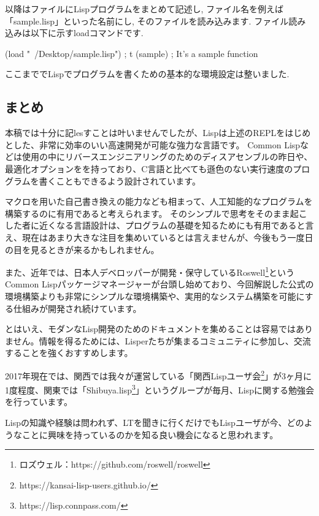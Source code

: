 \documentclass[mingoth,a4paper]{jsarticle}
\begin{document}
以降はファイルにLispプログラムをまとめて記述し, ファイル名を例えば「sample.lisp」といった名前にし, そのファイルを読み込みます. ファイル読み込みは以下に示すloadコマンドです. 

\begin{commandline}
(load "~/Desktop/sample.lisp")
; t
(sample)
; It's a sample function
\end{commandline}

ここまででLispでプログラムを書くための基本的な環境設定は整いました. 


\subsection{まとめ}
本稿では十分に記lesすことは叶いませんでしたが、Lispは上述のREPLをはじめとした、非常に効率のいい高速開発が可能な強力な言語です。
Common Lispなどは使用の中にリバースエンジニアリングのためのディスアセンブルの昨日や、最適化オプションをを持っており、C言語と比べても遜色のない実行速度のプログラムを書くこともできるよう設計されています。

マクロを用いた自己書き換えの能力なども相まって、人工知能的なプログラムを構築するのに有用であると考えられます。
そのシンプルで思考をそのまま起こした者に近くなる言語設計は、プログラムの基礎を知るためにも有用であると言え、現在はあまり大きな注目を集めいているとは言えませんが、今後もう一度日の目を見るときが来るかもしれません。

また、近年では、日本人デベロッパーが開発・保守しているRoswell\footnote{ロズウェル：https://github.com/roswell/roswell}というCommon Lispパッケージマネージャーが台頭し始めており、今回解説した公式の環境構築よりも非常にシンプルな環境構築や、実用的なシステム構築を可能にする仕組みが開発され続けています。

とはいえ、モダンなLisp開発のためのドキュメントを集めることは容易ではありません。情報を得るためには、Lisperたちが集まるコミュニティに参加し、交流することを強くおすすめします。

2017年現在では、関西では我々が運営している「関西Lispユーザ会\footnote{https://kansai-lisp-users.github.io/}」が3ヶ月に1度程度、関東では「Shibuya.lisp\footnote{https://lisp.connpass.com/}」というグループが毎月、Lispに関する勉強会を行っています。

Lispの知識や経験は問われず、LTを聞きに行くだけでもLispユーザが今、どのようなことに興味を持っているのかを知る良い機会になると思われます。


\pagebreak
\end{document}
